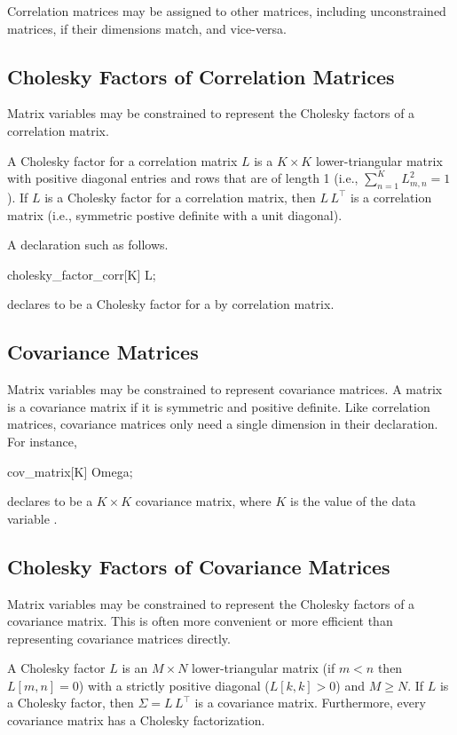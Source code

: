 Correlation matrices may be assigned to other matrices, including
unconstrained matrices, if their dimensions match, and vice-versa.

\subsection{Cholesky Factors of Correlation Matrices}

Matrix variables may be constrained to represent the Cholesky factors
of a correlation matrix.

A Cholesky factor for a correlation matrix $L$ is a $K \times K$
lower-triangular matrix with positive diagonal entries and rows that
are of length 1 (i.e., $\sum_{n=1}^K L_{m,n}^2 = 1$).  If $L$ is a
Cholesky factor for a correlation matrix, then $L\,L^{\top}$ is a
correlation matrix (i.e., symmetric postive definite with a unit
diagonal).

A declaration such as
follows.
%
\begin{stancode}
cholesky_factor_corr[K] L;
\end{stancode}
%
declares  to be a Cholesky factor for a  by 
correlation matrix.

\subsection{Covariance Matrices}

Matrix variables may be constrained to represent covariance matrices.
A matrix is a covariance matrix if it is symmetric and positive
definite.  Like correlation matrices, covariance matrices only need a
single dimension in their declaration.  For instance,
%
\begin{stancode}
cov_matrix[K] Omega;
\end{stancode}
%
declares  to be a $K \times K$ covariance matrix, where
$K$ is the value of the data variable .

\subsection{Cholesky Factors of Covariance Matrices}

Matrix variables may be constrained to represent the Cholesky factors
of a covariance matrix.  This is often more convenient or more
efficient than representing covariance matrices directly.

A Cholesky factor $L$ is an $M \times N$ lower-triangular matrix (if
$m < n$ then $L[m, n] =0$) with a strictly positive diagonal ($L[k, k]
> 0$) and $M \geq N$.  If $L$ is a Cholesky factor, then $\Sigma = L
\, L^{\top}$ is a covariance matrix.  Furthermore, every covariance
matrix has a Cholesky factorization.

